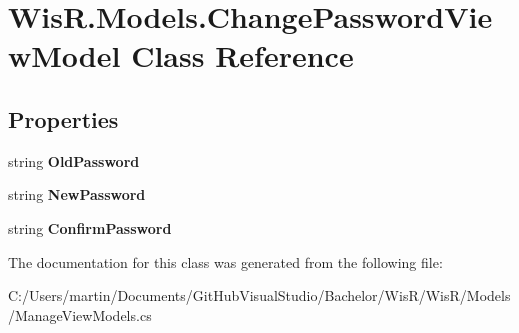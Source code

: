 \hypertarget{class_wis_r_1_1_models_1_1_change_password_view_model}{}\section{Wis\+R.\+Models.\+Change\+Password\+View\+Model Class Reference}
\label{class_wis_r_1_1_models_1_1_change_password_view_model}
\subsection*{Properties}
\begin{DoxyCompactItemize}
\item 
\hypertarget{class_wis_r_1_1_models_1_1_change_password_view_model_a572fb8759b509047c5049fefd570359d}{}string {\bfseries Old\+Password}\label{class_wis_r_1_1_models_1_1_change_password_view_model_a572fb8759b509047c5049fefd570359d}

\item 
\hypertarget{class_wis_r_1_1_models_1_1_change_password_view_model_a1aec0be4e908bb59bd76e707292ff3b4}{}string {\bfseries New\+Password}\label{class_wis_r_1_1_models_1_1_change_password_view_model_a1aec0be4e908bb59bd76e707292ff3b4}

\item 
\hypertarget{class_wis_r_1_1_models_1_1_change_password_view_model_a1679ee2415b770661bc60b28f67a5df7}{}string {\bfseries Confirm\+Password}\label{class_wis_r_1_1_models_1_1_change_password_view_model_a1679ee2415b770661bc60b28f67a5df7}

\end{DoxyCompactItemize}


The documentation for this class was generated from the following file\+:\begin{DoxyCompactItemize}
\item 
C\+:/\+Users/martin/\+Documents/\+Git\+Hub\+Visual\+Studio/\+Bachelor/\+Wis\+R/\+Wis\+R/\+Models/Manage\+View\+Models.\+cs\end{DoxyCompactItemize}
